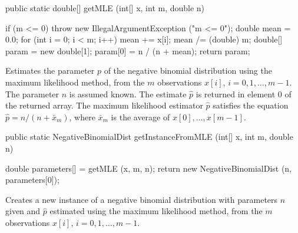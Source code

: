 \begin{code}

   public static double[] getMLE (int[] x, int m, double n)\begin{hide} {
      if (m <= 0)
         throw new IllegalArgumentException ("m <= 0");
      double mean = 0.0;
      for (int i = 0; i < m; i++) {
         mean += x[i];
      }
      mean /= (double) m;
      double[] param = new double[1];
      param[0] = n / (n + mean);
      return param;
   }\end{hide}
\end{code}
\begin{tabb}
   Estimates the parameter $p$ of the negative binomial distribution
   using the maximum likelihood method, from the $m$ observations
   $x[i]$, $i = 0, 1, \ldots, m-1$. The parameter
   $n$ is assumed known.
   The estimate $\hat{p}$ is returned in element 0
   of the returned array.
   The maximum likelihood estimator $\hat{p}$ satisfies the equation
   $\hat{p} = n /(n + \bar{x}_m)$,
   where  $\bar{x}_m$ is the average of $x[0], \ldots, x[m-1]$.
\end{tabb}
\begin{htmlonly}
\end{htmlonly}
\begin{code}

   public static NegativeBinomialDist getInstanceFromMLE (int[] x, int m,
                                                          double n)\begin{hide} {
      double parameters[] = getMLE (x, m, n);
      return new NegativeBinomialDist (n, parameters[0]);
   }\end{hide}
\end{code}
\begin{tabb}
   Creates a new instance of a negative binomial distribution with parameters
  $n$ given and $\hat{p}$ estimated using the maximum
   likelihood method, from the $m$ observations $x[i]$,
   $i = 0, 1, \ldots, m-1$.
\end{tabb}
\begin{htmlonly}
\end{htmlonly}
